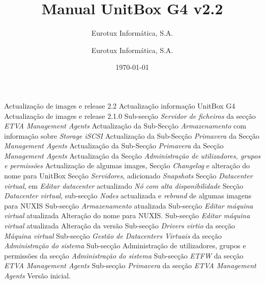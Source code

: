 \documentclass[12pt,a4paper,portuges]{scrreprt}
\author{Eurotux Informática, S.A.}
\title{Manual UnitBox G4 v2.2}
\subtitle{Eurotux Informática, S.A.}
\date{\today}
\begin{document}
\maketitle

\begin{Log}
Actualização de images e release 2.2
Actualização informação UnitBox G4
Actualização de images e release 2.1.0
Sub-secção \textit{Servidor de ficheiros} da secção \textit{ETVA Management Agents}
Actualização da Sub-Secção \textit{Armazenamento} com informação sobre \emph{Storage iSCSI}
Actualização da Sub-Secção \textit{Primavera} da Secção \textit{Management Agents}
Actualização da Sub-Secção \textit{Primavera} da Secção \textit{Management Agents}
Actualização da Secção \textit{Administração de utilizadores, grupos e permissões}
Actualização de algumas images, Secção \textit{Changelog} e alteração do nome para UnitBox
Secção \textit{Servidores}, adicionado \textit{Snapshots}
Secção \textit{Datacenter virtual}, em \textit{Editar datacenter} actualizado \textit{Nó com alta disponibilidade }
Secção \textit{Datacenter virtual}, sub-secção \textit{Nodes} actualizada e \textit{rebrand} de algumas imagens para NUXIS
Sub-secção \textit{Armazenamento} atualizada
Sub-secção \textit{Editar máquina virtual} atualizada
Alteração do nome para NUXIS. Sub-secção \textit{Editar máquina virtual} atualizada
Alteração da versão
Sub-secção \textit{Drivers virtio} da secção \textit{Máquina virtual}
Sub-secção \textit{Gestão de Datacenters Virtuais} da secção \textit{Administração do sistema}
Sub-secção Administração de utilizadores, grupos e permissões da secção \textit{Administração do sistema}
Sub-secção \textit{ETFW} da secção \textit{ETVA Management Agents}
Sub-secção \textit{Primavera} da secção \textit{ETVA Management Agents}
Versão inicial.
\end{Log}

\tableofcontents

\listoffigures


%
%




\end{document}
